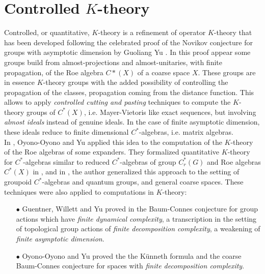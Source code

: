\section{Controlled $K$-theory}

Controlled, or quantitative, $K$-theory is a refinement of operator $K$-theory that has been developed following the celebrated proof of the Novikov conjecture for groups with asymptotic dimension by Guoliang Yu \cite{Yu1}. In this proof appear some groups build from almost-projections and almost-unitaries, with finite propagation, of the Roe algebra $C*(X)$ of a coarse space $X$. These groups are in essence $K$-theory groups with the added possibility of controlling the propagation of the classes, propagation coming from the distance function. This allows to apply \textit{controlled cutting and pasting} techniques to compute the $K$-theory groups of $C^*(X)$, i.e. Mayer-Vietoris like exact sequences, but involving \textit{almost ideals} instead of genuine ideals. In the case of finite asymptotic dimension, these ideals reduce to finite dimensional $C^*$-algebras, i.e. matrix algebras.\\

In \cite{OY1}, Oyono-Oyono and Yu applied this idea to the computation of the $K$-theory of the Roe algebras of some expanders. They formalized quantitative $K$-theory for $C^*$-algebras similar to reduced $C^*$-algebras of group $C^*_r(G)$ and Roe algebras $C^*(X)$ in \cite{OY2}, and in \cite{dell2018controlled}, the author generalized this approach to the setting of groupoid $C^*$-algebras and quantum groups, and general coarse spaces. These techniques were also applied to computations in $K$-theory:\\
\begin{itemize} 
\item[$\bullet$] Guentner, Willett and Yu proved in \cite{GWY2} the Baum-Connes conjecture for group actions which have \textit{finite dynamical complexity}, a transcription in the setting of topological group actions of \textit{finite decomposition complexity}, a weakening of \textit{finite asymptotic dimension}.\\   
\item[$\bullet$] Oyono-Oyono and Yu proved the the K\"unneth formula \cite{oyono2019quantitative} and the coarse Baum-Connes conjecture \cite{} for spaces with \textit{finite decomposition complexity}.\\
\end{itemize}

